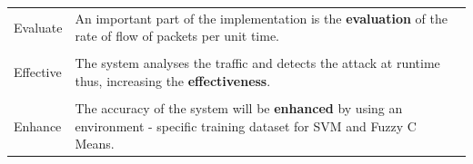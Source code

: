\documentclass[12pt,a4paper,final]{report}
\begin{document}
\newpage
\begin{center}
\begin{tabular}{|m{2cm}|m{7cm}|}
\hline

Evaluate & An important part of the implementation is the \textbf{evaluation} of the rate of flow of packets per unit time. \\

&\\

Effective & The system analyses the traffic and detects the attack at runtime thus, increasing the \textbf{effectiveness}. \\

&\\

Enhance & The accuracy of the system will be \textbf{enhanced} by using an environment - specific training dataset for SVM and Fuzzy C Means. \\

\hline
\end{tabular}
\end{center}
\end{document}

